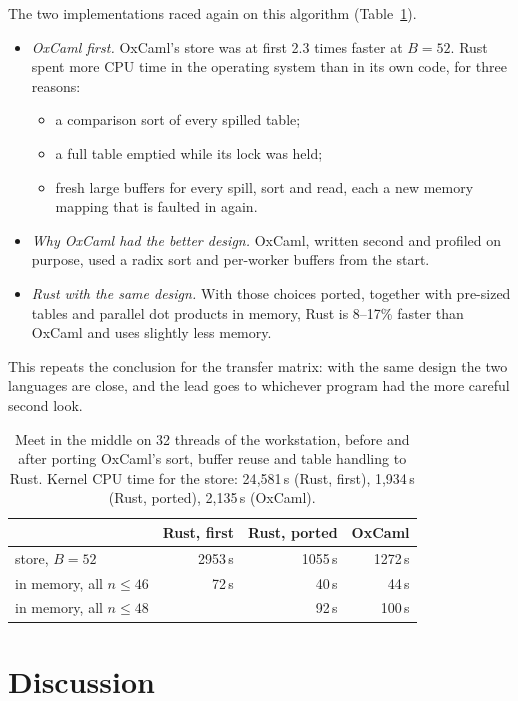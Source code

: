 \documentclass[11pt]{amsart}
\theoremstyle{definition}
\theoremstyle{remark}
\begin{document}
The two implementations raced again on this algorithm (Table~\ref{tab:mitm}).
\begin{itemize}
  \item \emph{OxCaml first.} OxCaml's store was at first 2.3 times faster at $B = 52$. Rust
    spent more CPU time in the operating system than in its own code, for three reasons:
    \begin{itemize}
      \item a comparison sort of every spilled table;
      \item a full table emptied while its lock was held;
      \item fresh large buffers for every spill, sort and read, each a new memory mapping
        that is faulted in again.
    \end{itemize}
  \item \emph{Why OxCaml had the better design.} OxCaml, written second and profiled on
    purpose, used a radix sort and per-worker buffers from the start.
  \item \emph{Rust with the same design.} With those choices ported, together with
    pre-sized tables and parallel dot products in memory, Rust is 8--17\% faster than OxCaml
    and uses slightly less memory.
\end{itemize}
This repeats the conclusion for the transfer matrix: with the same design the two languages
are close, and the lead goes to whichever program had the more careful second look.

\begin{table}[t]
\centering
\begin{tabular}{lrrr}
\toprule
 & Rust, first & Rust, ported & OxCaml \\
\midrule
store, $B = 52$ & 2953\,s & 1055\,s & 1272\,s \\
in memory, all $n \le 46$ & 72\,s & 40\,s & 44\,s \\
in memory, all $n \le 48$ & & 92\,s & 100\,s \\
\bottomrule
\end{tabular}
\caption{Meet in the middle on 32 threads of the workstation, before and after porting
OxCaml's sort, buffer reuse and table handling to Rust. Kernel CPU time for the store:
24{,}581\,s (Rust, first), 1{,}934\,s (Rust, ported), 2{,}135\,s (OxCaml).}\label{tab:mitm}
\end{table}

\section{Discussion}
\end{document}
